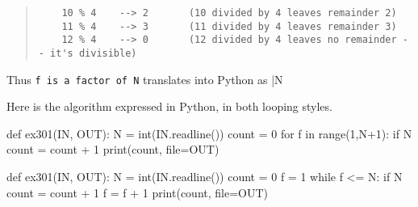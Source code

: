 \begin{quote}
  \begin{verbatim}
    10 % 4    --> 2       (10 divided by 4 leaves remainder 2)
    11 % 4    --> 3       (11 divided by 4 leaves remainder 3)
    12 % 4    --> 0       (12 divided by 4 leaves no remainder -- it's divisible)
  \end{verbatim}
\end{quote}

Thus \texttt{f is a factor of N} translates into Python as \pycode|N %

\Solution

Here is the algorithm expressed in Python, in both looping styles.


\begin{minipage}{\textwidth}
  \begin{pythoncode}
    def ex301(IN, OUT):
      N = int(IN.readline())
      count = 0
      for f in range(1,N+1):
        if N %
          count = count + 1
      print(count, file=OUT)

    def ex301(IN, OUT):
      N = int(IN.readline())
      count = 0
      f = 1
      while f <= N:
        if N %
          count = count + 1
        f = f + 1
      print(count, file=OUT)
  \end{pythoncode}
\end{minipage}
